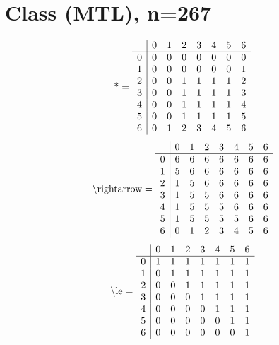\documentclass[11pt]{article}
\begin{document}
\section{Class (MTL), n=267}
\[\text{*} = 
\begin{array}{r | r r r r r r r}
 & 0 & 1 & 2 & 3 & 4 & 5 & 6 \\ \hline
0 & 0 & 0 & 0 & 0 & 0 & 0 & 0 \\
1 & 0 & 0 & 0 & 0 & 0 & 0 & 1 \\
2 & 0 & 0 & 1 & 1 & 1 & 1 & 2 \\
3 & 0 & 0 & 1 & 1 & 1 & 1 & 3 \\
4 & 0 & 0 & 1 & 1 & 1 & 1 & 4 \\
5 & 0 & 0 & 1 & 1 & 1 & 1 & 5 \\
6 & 0 & 1 & 2 & 3 & 4 & 5 & 6 \\
\end{array}
\]
\[\text{\textbackslash rightarrow} = 
\begin{array}{r | r r r r r r r}
 & 0 & 1 & 2 & 3 & 4 & 5 & 6 \\ \hline
0 & 6 & 6 & 6 & 6 & 6 & 6 & 6 \\
1 & 5 & 6 & 6 & 6 & 6 & 6 & 6 \\
2 & 1 & 5 & 6 & 6 & 6 & 6 & 6 \\
3 & 1 & 5 & 5 & 6 & 6 & 6 & 6 \\
4 & 1 & 5 & 5 & 5 & 6 & 6 & 6 \\
5 & 1 & 5 & 5 & 5 & 5 & 6 & 6 \\
6 & 0 & 1 & 2 & 3 & 4 & 5 & 6 \\
\end{array}
\]
\[\text{\textbackslash le} = 
\begin{array}{r | r r r r r r r}
 & 0 & 1 & 2 & 3 & 4 & 5 & 6 \\ \hline
0 & 1 & 1 & 1 & 1 & 1 & 1 & 1 \\
1 & 0 & 1 & 1 & 1 & 1 & 1 & 1 \\
2 & 0 & 0 & 1 & 1 & 1 & 1 & 1 \\
3 & 0 & 0 & 0 & 1 & 1 & 1 & 1 \\
4 & 0 & 0 & 0 & 0 & 1 & 1 & 1 \\
5 & 0 & 0 & 0 & 0 & 0 & 1 & 1 \\
6 & 0 & 0 & 0 & 0 & 0 & 0 & 1 \\
\end{array}
\]
\end{document}
